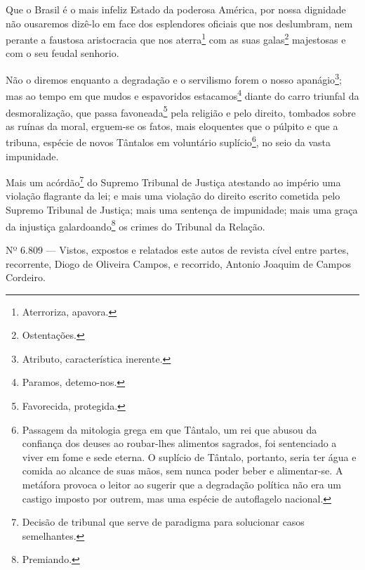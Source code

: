 Que o Brasil é o mais infeliz Estado da poderosa América, por nossa
dignidade não ousaremos dizê-lo em face dos esplendores oficiais que nos
deslumbram, nem perante a faustosa aristocracia que nos
aterra\footnote{Aterroriza, apavora.} com as suas galas\footnote{
  Ostentações.} majestosas e com o seu feudal senhorio.

Não o diremos enquanto a degradação e o servilismo forem o nosso
apanágio\footnote{Atributo, característica inerente.}; mas ao tempo em
que mudos e espavoridos estacamos\footnote{Paramos, detemo-nos.}
diante do carro triunfal da desmoralização, que passa
favoneada\footnote{Favorecida, protegida.} pela religião e pelo
direito, tombados sobre as ruínas da moral, erguem-se os fatos, mais
eloquentes que o púlpito e que a tribuna, espécie de novos Tântalos em
voluntário suplício\footnote{Passagem da mitologia grega em que
  Tântalo, um rei que abusou da confiança dos deuses ao roubar-lhes
  alimentos sagrados, foi sentenciado a viver em fome e sede eterna. O
  suplício de Tântalo, portanto, seria ter água e comida ao alcance de
  suas mãos, sem nunca poder beber e alimentar-se. A metáfora provoca o
  leitor ao sugerir que a degradação política não era um castigo imposto
  por outrem, mas uma espécie de autoflagelo nacional.}, no seio da
vasta impunidade.

Mais um acórdão\footnote{Decisão de tribunal que serve de paradigma
  para solucionar casos semelhantes.} do Supremo Tribunal de Justiça
atestando ao império uma violação flagrante da lei; e mais uma violação
do direito escrito cometida pelo Supremo Tribunal de Justiça; mais uma
sentença de impunidade; mais uma graça da injustiça
galardoando\footnote{Premiando.} os crimes do Tribunal da Relação.

Nº 6.809 --- Vistos, expostos e relatados este autos de revista cível
entre partes, recorrente, Diogo de Oliveira Campos, e recorrido, Antonio
Joaquim de Campos Cordeiro.

